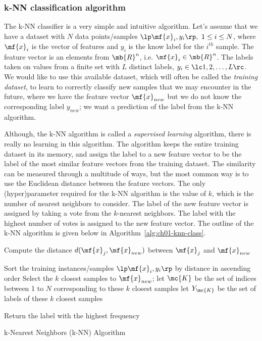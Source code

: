 \subsubsection{k-NN classification algorithm}
The k-NN classifier is a very simple and intuitive algorithm. Let's assume that we have a dataset with $N$ data points/samples $\lp \mf{x}_i, y_i\rp, \,\, 1 \leq i \leq N$, where $\mf{x}_i$ is the vector of features and $y_i$ is the know label for the $i^{th}$ sample. The feature vector is an elements from $\mb{R}^n$, i.e. $\mf{x}_i \in \mb{R}^n$. The labels taken on values from a finite set with $L$ distinct labels, $y_i \in \lc 1, 2, \ldots, L\rc$. We would like to use this available dataset, which will often be called the \textit{training dataset}, to learn to correctly classify new samples that we may encounter in the future, where we have the feature vector $\mf{x}_{new}$ but we do not know the corresponding label $y_{new}$; we want a prediction of the label from the k-NN algorithm. 

Although, the k-NN algorithm is called a \textit{supervised learning} algorithm, there is really no learning in this algorithm. The algorithm keeps the entire training dataset in its memory, and assign the label to a new feature vector to be the label of the most similar feature vectors from the training dataset. The similarity can be measured through a multitude of ways, but the most common way is to use the Euclidean distance between the feature vectors. The only (hyper)parameter required for the k-NN algorithm is the value of $k$, which is the number of nearest neighbors to consider. The label of the new feature vector is assigned by taking a vote from the $k$-nearest neighbors. The label with the highest number of votes is assigned to the new feature vector. The outline of the k-NN algorithm is given below in Algorithm~\ref{alg:ch01-knn-class}.

\begin{boxedstuff}
\begin{algorithm}[H]
    \SetAlgoLined
    
    \BlankLine
     {
        Compute the distance $d(\mf{x}_j, \mf{x}_{new})$ between $\mf{x}_j$ and $\mf{x}_{new}$\;
    }
    
    Sort the training instances/samples $\lp \mf{x}_i, y_i\rp$ by distance in ascending order\;
    Select the $k$ closest samples to $\mf{x}_{new}$; let $\mc{K}$ be the set of indices between 1 to $N$ corresponding to these $k$ closest samples\; let $Y_{\mc{K}}$ be the set of labels of these $k$ closest samples\;
    \BlankLine
    
    Return the label with the highest frequency\;
    \caption{k-Nearest Neighbors (k-NN) Algorithm}
    \label{alg:ch01-knn-class}
\end{algorithm}
\end{boxedstuff}

